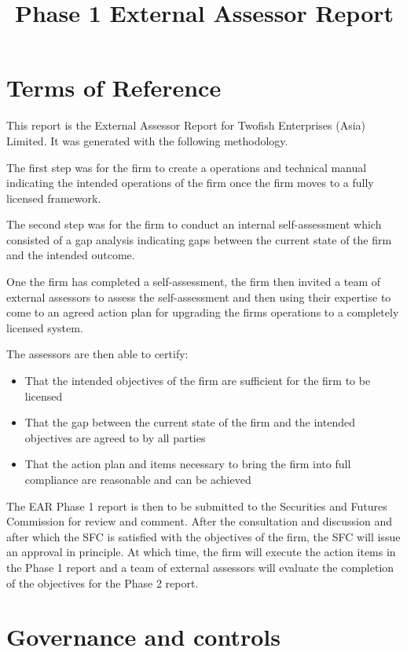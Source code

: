 \documentclass[]{report}
\title{Phase 1 External Assessor Report}
\author{\firmfullname}
\def\firmfullname{Twofish Enterprises (Asia) Limited}
\begin{document}
\maketitle
\section{Terms of Reference}

This report is the External Assessor Report for \firmfullname.  It was
generated with the following methodology.

The first step was for the firm to create a operations and technical
manual indicating the intended operations of the firm once the firm
moves to a fully licensed framework.

The second step was for the firm to conduct an internal
self-assessment which consisted of a gap analysis indicating gaps
between the current state of the firm and the intended outcome.

One the firm has completed a self-assessment, the firm then invited a
team of external assessors to assess the self-assessment and then
using their expertise to come to an agreed action plan for upgrading
the firms operations to a completely licensed system.

The assessors are then able to certify:

\begin{itemize}
  \item That the intended objectives of the firm are sufficient for
    the firm to be licensed
  \item That the gap between the current state of the firm and the
    intended objectives are agreed to by all parties
  \item That the action plan and items necessary to bring the firm
    into full compliance are reasonable and can be achieved
\end{itemize}

The EAR Phase 1 report is then to be submitted to the Securities and
Futures Commission for review and comment.  After the consultation and
discussion and after which the SFC is satisfied with the objectives of
the firm, the SFC will issue an approval in principle.  At which time,
the firm will execute the action items in the Phase 1 report and a
team of external assessors will evaluate the completion of the
objectives for the Phase 2 report.

\section{Governance and controls}
\end{document}
